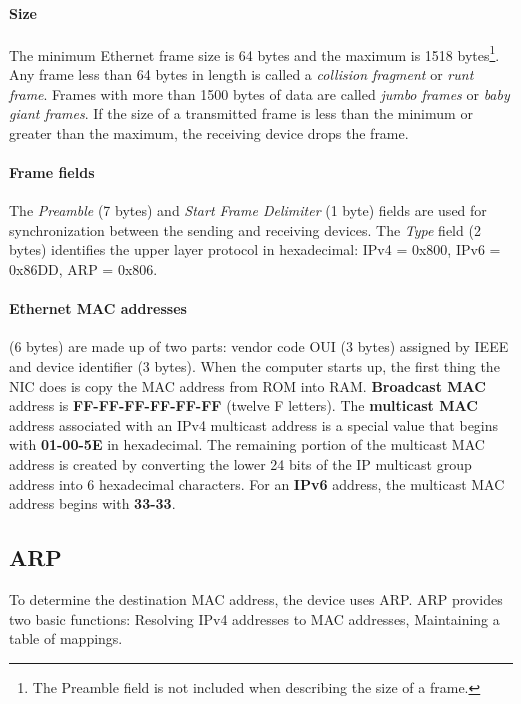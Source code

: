 {\paragraph{Size} The minimum Ethernet frame size is 64 bytes and the maximum is 1518 bytes\footnote{ The Preamble field is not included when describing the size of a frame.}. Any frame less than 64 bytes in length is called a \emph{collision fragment} or \emph{runt frame}. Frames with more than 1500 bytes of data are called \emph{jumbo frames} or \emph{baby giant frames}. If the size of a transmitted frame is less than the minimum or greater than the maximum, the receiving device drops the frame. 

\paragraph{Frame fields} The \emph{Preamble} (7 bytes) and \emph{Start Frame Delimiter} (1 byte) fields are used for synchronization between the sending and receiving devices. The \emph{Type} field (2 bytes) identifies the upper layer protocol in hexadecimal: IPv4 = 0x800, IPv6 = 0x86DD, ARP = 0x806.

\paragraph{Ethernet MAC addresses}(6 bytes) are made up of two parts: vendor code OUI (3 bytes) assigned by IEEE and device identifier (3 bytes). When the computer starts up, the first thing the NIC does is copy the MAC address from ROM into RAM. \textbf{Broadcast MAC} address is \textbf{FF-FF-FF-FF-FF-FF} (twelve F letters). The \textbf{multicast MAC} address associated with an IPv4 multicast address is a special value that begins with \textbf{01-00-5E} in hexadecimal. The remaining portion of the multicast MAC address is created by converting the lower 24 bits of the IP multicast group address into 6 hexadecimal characters. For an \textbf{IPv6} address, the multicast MAC address begins with \textbf{33-33}.



\subsection{ARP}

To determine the destination MAC address, the device uses ARP. ARP provides two basic functions: Resolving IPv4 addresses to MAC addresses, Maintaining a table of mappings. \\

}
